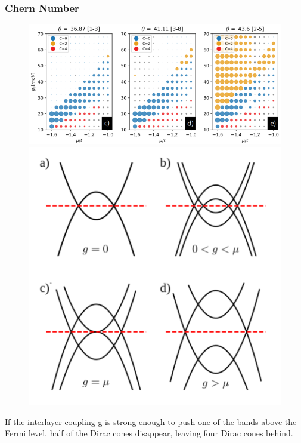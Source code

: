 \documentclass{beamer}
\begin{document}
\begin{frame}
\frametitle{Chern Number}
\begin{figure}
\centering
\includegraphics[scale=0.4]{pic/p11.png}
\includegraphics[scale=0.5]{pic/p12.png}
\end{figure}
\begin{block}{}
If the interlayer coupling g is strong
enough to push one of the bands above the Fermi level,
half of the Dirac cones disappear, leaving four Dirac cones behind.
\end{block}
\end{frame}
\end{document}

